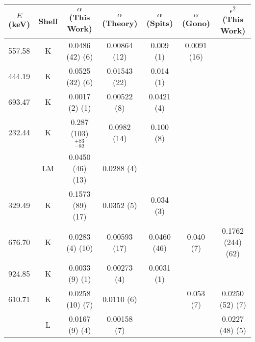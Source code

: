 \begin{table}
    \ContinuedFloat
    \begin{subtable}{\textwidth}
    \end{subtable}
    \begin{ThreePartTable}
    \begin{subtable}{\textwidth}
        \caption{}
        \begin{tabular}{c|c|c|c|c|c|c}
            \toprule
            $E$ (keV) & Shell &	$\alpha$ (This Work)	&	$\alpha$  (Theory)\citep{kibedi08:_BRICC}	&	$\alpha$ (Spits)\citep{spits96:_154gd} & $\alpha$ (Gono)\citep{gono74:_154gd_e0}	& $\epsilon^2$ (This Work)	\\
            \hline
            557.58	& K &	0.0486	(42) (6)	&	0.00864 (12)	&	0.009 (1) & 0.0091 (16)	& \\
            \hline
            444.19	& K &	0.0525	(32) (6)	&	0.01543 (22)	&	0.014 (1)&	\\
            \hline
            693.47	& K &	0.0017	(2) (1)	&	0.00522 (8)	&	0.0421 (4) &	\\
            \hline
            232.44	& K &	0.287	(103) $^{+83}_{-82}$	&	0.0982 (14)	&	0.100 (8)	& \\
            &	LM &		0.0450	(46) (13)	&	0.0288 (4)	&	&	\\
            \hline
            329.49	 & K &	0.1573	(89) (17)	&	0.0352 (5)	&	0.034 (3)	&\\
            \hline
            676.70	& K &	0.0283	(4) (10)	&	0.00593 (17)	&	0.0460 (46) & 0.040 (7)	& 0.1762 (244) (62)\\
            \hline
            924.85	& K &	0.0033	(9) (1)	&	0.00273 (4)	&	0.0031 (1)	&\\
            \hline
            610.71	& K &	0.0258	(10) (7)	&	0.0110 (6)	& &	0.053 (7)	& 0.0250 (52) (7)\\
            		& L &	0.0167	(9) (4)	&	0.00158 (7)	&	&	& 0.0227 (48) (5) \\
            \bottomrule
        \end{tabular}
        \end{subtable}

        \makeatletter\def\TPT@hsize{}\makeatletter
        

\end{ThreePartTable}
\end{table}
